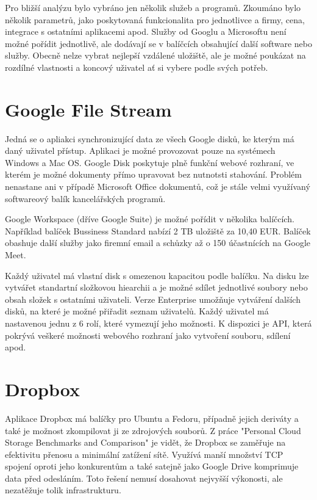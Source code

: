 Pro bližší analýzu bylo vybráno jen několik služeb a programů. Zkoumáno bylo několik parametrů, jako poskytovaná funkcionalita pro jednotlivce a firmy, cena,
integrace s ostatními aplikacemi apod. Služby od Googlu a Microsoftu není možné pořídit jednotlivě, ale dodávají se v balíčcích obsahující další software
nebo služby. Obecně nelze vybrat nejlepší vzdálené uložiště, ale je možné poukázat na rozdílné vlastnosti a koncový uživatel ať si vybere podle svých potřeb.

\section{Google File Stream}

Jedná se o apliakci synchronizující data ze všech Google disků, ke kterým má daný uživatel přístup. Aplikaci je možné provozovat pouze na systémech
Windows a Mac OS.\cite{GoogleFileStream} Google Disk poskytuje plně funkční webové rozhraní, ve kterém je možné dokumenty přímo upravovat bez nutnotsti stahování. 
Problém nenastane ani v případě Microsoft Office dokumentů, což je stále velmi využívaný softwareový balík kancelářských programů.

Google Workspace (dříve Google Suite) je možné pořídit v několika balíčcích. Například balíček Bussiness Standard nabízí 2 TB uložiště za 10,40 EUR. Balíček obashuje
další služby jako firemní email a schůzky až o 150 účastnících na Google Meet.\cite{GoogleWorkspace}

Každý uživatel má vlastní disk s omezenou kapacitou podle balíčku. Na disku lze vytvářet standartní složkovou hiearchii a je možné sdílet jednotlivé soubory nebo
obsah složek s ostatními uživateli. Verze Enterprise umožňuje vytváření dalších disků, na které je možné přiřadit seznam uživatelů. Každý uživatel má nastavenou jednu 
z 6 rolí, které vymezují jeho možnosti. K dispozici je API, která pokrývá veškeré možnosti webového rozhraní jako vytvoření souboru, sdílení apod.\cite{GoogleAPIReference}

\section{Dropbox}

Aplikace Dropbox má balíčky pro Ubuntu a Fedoru, případně jejich deriváty a také je možnost zkompilovat ji ze zdrojových souborů. 
Z práce "Personal Cloud Storage Benchmarks and Comparison" je vidět, že Dropbox se zaměřuje na efektivitu přenosu a minimální zatížení sítě.
Využívá manší množství TCP spojení oproti jeho konkurentům a také satejně jako Google Drive komprimuje data před odesláním.\cite{CloudStorageComparison}
Toto řešení nemusí dosahovat nejvyšší výkonosti, ale nezatěžuje tolik infrastrukturu. 

